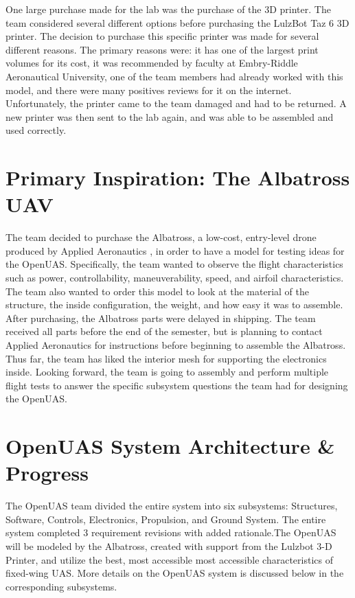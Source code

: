 \documentclass{article}
\begin{document}
\noindent One large purchase made for the lab was the purchase of the 3D printer. The team considered several different options before purchasing the LulzBot Taz 6 3D printer. The decision to purchase this specific printer was made for several different reasons. The primary reasons were: it has one of the largest print volumes for its cost, it was recommended by faculty at Embry-Riddle Aeronautical University, one of the team members had already worked with this model, and there were many positives reviews for it on the internet. Unfortunately, the printer came to the team damaged and had to be returned. A new printer was then sent to the lab again, and was able to be assembled and used correctly.\\

\section{Primary Inspiration: The Albatross UAV}
\noindent The team decided to purchase the Albatross, a low-cost, entry-level drone produced by Applied Aeronautics \cite{AlbatrossFAQ}, in order to have a model for testing ideas for the OpenUAS. Specifically, the team wanted to observe the flight characteristics such as power, controllability, maneuverability, speed, and airfoil characteristics. The team also wanted to order this model to look at the material of the structure, the inside configuration, the weight, and how easy it was to assemble. After purchasing, the Albatross parts were delayed in shipping. The team received all parts before the end of the semester, but is planning to contact Applied Aeronautics for instructions before beginning to assemble the Albatross.\\

\noindent Thus far, the team has liked the interior mesh for supporting the electronics inside. Looking forward, the team is going to assembly and perform multiple flight tests to answer the specific subsystem questions the team had for designing the OpenUAS. 


\section{OpenUAS System Architecture \& Progress}
\noindent The OpenUAS team divided the entire system into six subsystems: Structures, Software, Controls, Electronics, Propulsion, and Ground System. The entire system completed 3 requirement revisions with added rationale.The OpenUAS will be modeled by the Albatross, created with support from the Lulzbot 3-D Printer, and utilize the best, most accessible most accessible characteristics of fixed-wing UAS. More details on the OpenUAS system is discussed below in the corresponding subsystems. \\
\end{document}
